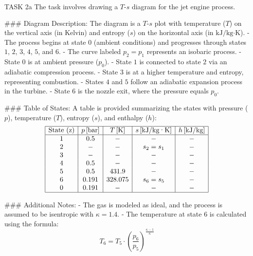 TASK 2a  
The task involves drawing a \( T \)-\( s \) diagram for the jet engine process.  

### Diagram Description:  
The diagram is a \( T \)-\( s \) plot with temperature (\( T \)) on the vertical axis (in Kelvin) and entropy (\( s \)) on the horizontal axis (in \( \text{kJ}/\text{kg·K} \)).  
- The process begins at state \( 0 \) (ambient conditions) and progresses through states \( 1 \), \( 2 \), \( 3 \), \( 4 \), \( 5 \), and \( 6 \).  
- The curve labeled \( p_2 = p_1 \) represents an isobaric process.  
- State \( 0 \) is at ambient pressure (\( p_0 \)).  
- State \( 1 \) is connected to state \( 2 \) via an adiabatic compression process.  
- State \( 3 \) is at a higher temperature and entropy, representing combustion.  
- States \( 4 \) and \( 5 \) follow an adiabatic expansion process in the turbine.  
- State \( 6 \) is the nozzle exit, where the pressure equals \( p_0 \).  

### Table of States:  
A table is provided summarizing the states with pressure (\( p \)), temperature (\( T \)), entropy (\( s \)), and enthalpy (\( h \)):  
\[
\begin{array}{|c|c|c|c|c|}
\hline
\text{State (z)} & p \, [\text{bar}] & T \, [\text{K}] & s \, [\text{kJ}/\text{kg·K}] & h \, [\text{kJ}/\text{kg}] \\
\hline
1 & 0.5 & - & - & - \\
2 & - & - & s_2 = s_1 & - \\
3 & - & - & - & - \\
4 & 0.5 & - & - & - \\
5 & 0.5 & 431.9 & - & - \\
6 & 0.191 & 328.075 & s_6 = s_5 & - \\
0 & 0.191 & - & - & - \\
\hline
\end{array}
\]

### Additional Notes:  
- The gas is modeled as ideal, and the process is assumed to be isentropic with \( \kappa = 1.4 \).  
- The temperature at state \( 6 \) is calculated using the formula:  
\[
T_6 = T_5 \cdot \left( \frac{p_6}{p_5} \right)^{\frac{\kappa - 1}{\kappa}}
\]